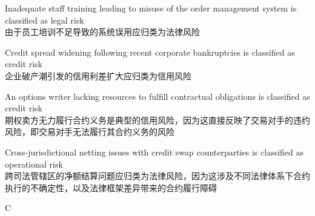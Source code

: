 \documentclass{article}
\begin{document}
\begin{choices}
    \item Inadequate staff training leading to misuse of the order management system is classified as legal risk \\
    由于员工培训不足导致的系统误用应归类为法律风险
    
    \item Credit spread widening following recent corporate bankruptcies is classified as credit risk \\
    企业破产潮引发的信用利差扩大应归类为信用风险
    
    \item An options writer lacking resources to fulfill contractual obligations is classified as credit risk \\
    期权卖方无力履行合约义务是典型的信用风险，因为这直接反映了交易对手的违约风险，即交易对手无法履行其合约义务的风险
    
    \item Cross-jurisdictional netting issues with credit swap counterparties is classified as operational risk \\
    跨司法管辖区的净额结算问题应归类为法律风险，因为这涉及不同法律体系下合约执行的不确定性，以及法律框架差异带来的合约履行障碍
\end{choices}

\begin{correctanswer}
    C
\end{correctanswer}
\end{document}
